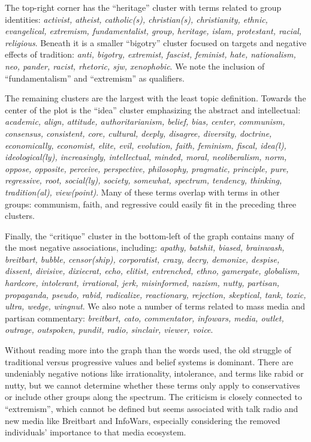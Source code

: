 \documentclass[doublespacing]{utdthesis}
\begin{document}
The top-right corner has the ``heritage'' cluster with terms related to group identities: \emph{activist, atheist, catholic(s), christian(s), christianity, ethnic, evangelical, extremism, fundamentalist, group, heritage, islam, protestant, racial, religious}.
Beneath it is a smaller ``bigotry'' cluster focused on targets and negative effects of tradition: \emph{anti, bigotry, extremist, fascist, feminist, hate, nationalism, neo, pander, racist, rhetoric, sjw, xenophobic}.
We note the inclusion of ``fundamentalism'' and ``extremism''  as qualifiers.

The remaining clusters are the largest with the least topic definition.
Towards the center of the plot is the ``idea'' cluster emphasizing the abstract and intellectual: \emph{academic, align, attitude, authoritarianism, belief, bias, center, communism, consensus, consistent, core, cultural, deeply, disagree, diversity, doctrine, economically, economist, elite, evil, evolution, faith, feminism, fiscal, idea(l), ideological(ly), increasingly, intellectual, minded, moral, neoliberalism, norm, oppose, opposite, perceive, perspective, philosophy, pragmatic, principle, pure, regressive, root, social(ly), society, somewhat, spectrum, tendency, thinking, tradition(al), view(point)}.
Many of these terms overlap with terms in other groups: communism, faith, and regressive could easily fit in the preceding three clusters.

Finally, the ``critique'' cluster in the bottom-left of the graph contains many of the most negative associations, including: \emph{apathy, batshit, biased, brainwash, breitbart, bubble, censor(ship), corporatist, crazy, decry, demonize, despise, dissent, divisive, dixiecrat, echo, elitist, entrenched, ethno, gamergate, globalism, hardcore, intolerant, irrational, jerk, misinformed, nazism, nutty, partisan, propaganda, pseudo, rabid, radicalize, reactionary, rejection, skeptical, tank, toxic, ultra, wedge, wingnut}.
We also note a number of terms related to mass media and partisan commentary: \emph{breitbart, cato, commentator, infowars, media, outlet, outrage, outspoken, pundit, radio, sinclair, viewer, voice}.

Without reading more into the graph than the words used, the old struggle of traditional versus progressive values and belief systems is dominant.
There are undeniably negative notions like irrationality, intolerance, and terms like rabid or nutty, but we cannot determine whether these terms only apply to conservatives or include other groups along the spectrum.
The criticism is closely connected to ``extremism'', which cannot be defined but seems associated with talk radio and new media like Breitbart and InfoWars, especially considering the removed individuals' importance to that media ecosystem.
\end{document}
